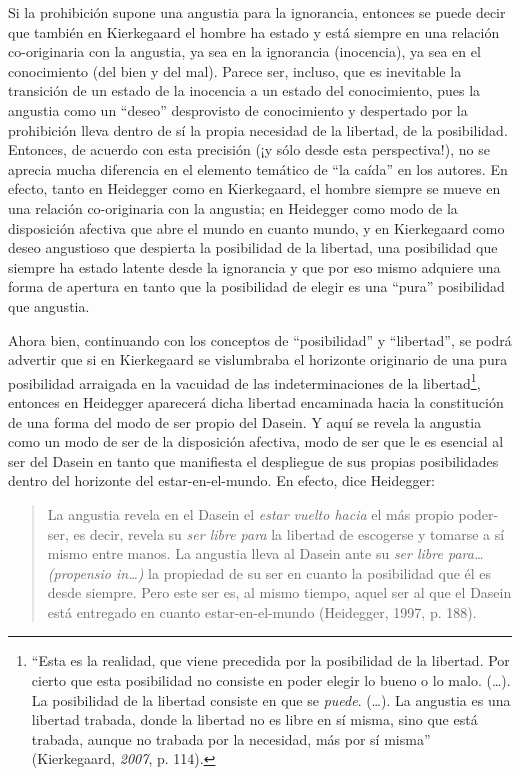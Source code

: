 \begin{refsection}
Si la prohibición supone una angustia para la ignorancia, entonces se puede decir que también en Kierkegaard el hombre ha estado y está siempre en una relación co-originaria con la angustia, ya sea en la ignorancia (inocencia), ya sea en el conocimiento (del bien y del mal). Parece ser, incluso, que es inevitable la transición de un estado de la inocencia a un estado del conocimiento, pues la angustia como un ``deseo'' desprovisto de conocimiento y despertado por la prohibición lleva dentro de sí la propia necesidad de la libertad, de la posibilidad. Entonces, de acuerdo con esta precisión (¡y sólo desde esta perspectiva!), no se aprecia mucha diferencia en el elemento temático de ``la caída'' en los autores. En efecto, tanto en Heidegger como en Kierkegaard, el hombre siempre se mueve en una relación co-originaria con la angustia; en Heidegger como modo de la disposición afectiva que abre el mundo en cuanto mundo, y en Kierkegaard como deseo angustioso que despierta la posibilidad de la libertad, una posibilidad que siempre ha estado latente desde la ignorancia y que por eso mismo adquiere una forma de apertura en tanto que la posibilidad de elegir es una ``pura'' posibilidad que angustia.

Ahora bien, continuando con los conceptos de ``posibilidad'' y ``libertad'', se podrá advertir que si en Kierkegaard se vislumbraba el horizonte originario de una pura posibilidad arraigada en la vacuidad de las indeterminaciones de la libertad\footnote{``Esta es la realidad, que viene precedida por la posibilidad de la libertad. Por cierto que esta posibilidad no consiste en poder elegir lo bueno o lo malo. (\ldots{}). La posibilidad de la libertad consiste en que se \emph{puede}. (\ldots{}). La angustia es una libertad trabada, donde la libertad no es libre en sí misma, sino que está trabada, aunque no trabada por la necesidad, más por sí misma'' (Kierkegaard, \emph{2007}, p. 114).}, entonces en Heidegger aparecerá dicha libertad encaminada hacia la constitución de una forma del modo de ser propio del Dasein. Y aquí se revela la angustia como un modo de ser de la disposición afectiva, modo de ser que le es esencial al ser del Dasein en tanto que manifiesta el despliegue de sus propias posibilidades dentro del horizonte del estar-en-el-mundo. En efecto, dice Heidegger:

\begin{quote}
La angustia revela en el Dasein el \emph{estar vuelto hacia} el más propio poder-ser, es decir, revela su \emph{ser libre para} la libertad de escogerse y tomarse a sí mismo entre manos. La angustia lleva al Dasein ante su \emph{ser libre para\ldots{} (propensio in\ldots{})} la propiedad de su ser en cuanto la posibilidad que él es desde siempre. Pero este ser es, al mismo tiempo, aquel ser al que el Dasein está entregado en cuanto estar-en-el-mundo (Heidegger, 1997, p. 188).
\end{quote}


\end{refsection}
